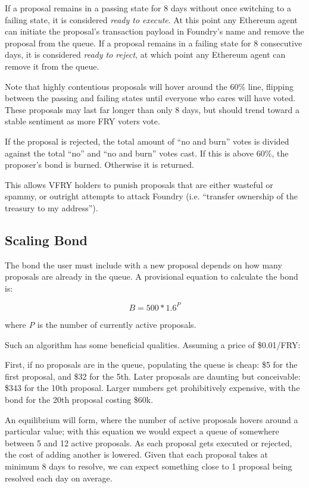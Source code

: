 \documentclass{article}
\begin{document}
If a proposal remains in a passing state for 8 days without once switching to a failing state, it is considered \textit{ready to execute}. At this point any Ethereum agent can initiate the proposal's transaction payload in Foundry's name and remove the proposal from the queue. If a proposal remains in a failing state for 8 consecutive days, it is considered \textit{ready to reject}, at which point any Ethereum agent can remove it from the queue.

Note that highly contentious proposals will hover around the 60\% line, flipping between the passing and failing states until everyone who cares will have voted. These proposals may last far longer than only 8 days, but should trend toward a stable sentiment as more FRY voters vote.

If the proposal is rejected, the total amount of ``no and burn'' votes is divided against the total ``no'' and ``no and burn'' votes cast. If this is above 60\%, the proposer's bond is burned. Otherwise it is returned.

This allows VFRY holders to punish proposals that are either wasteful or spammy, or outright attempts to attack Foundry (i.e. ``transfer ownership of the treasury to my address'').

\subsection{Scaling Bond} \label{bond}

The bond the user must include with a new proposal depends on how many proposals are already in the queue. A provisional equation to calculate the bond is:

\[B = 500 * 1.6^P\]

where \textit{P} is the number of currently active proposals.

Such an algorithm has some beneficial qualities. Assuming a price of \$0.01/FRY:

First, if no proposals are in the queue, populating the queue is cheap: \$5 for the first proposal, and \$32 for the 5th. Later proposals are daunting but conceivable: \$343 for the 10th proposal. Larger numbers get prohibitively expensive, with the bond for the 20th proposal costing \$60k.

An equilibrium will form, where the number of active proposals hovers around a particular value; with this equation we would expect a queue of somewhere between 5 and 12 active proposals. As each proposal gets executed or rejected, the cost of adding another is lowered. Given that each proposal takes at minimum 8 days to resolve, we can expect something close to 1 proposal being resolved each day on average.
\end{document}
